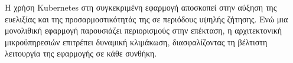 Η χρήση Kubernetes στη συγκεκριμένη εφαρμογή αποσκοπεί στην αύξηση της ευελιξίας και της προσαρμοστικότητάς της σε περιόδους υψηλής ζήτησης. Ενώ μια μονολιθική εφαρμογή παρουσιάζει περιορισμούς στην επέκταση, η αρχιτεκτονική μικροϋπηρεσιών επιτρέπει δυναμική κλιμάκωση, διασφαλίζοντας τη βέλτιστη λειτουργία της εφαρμογής σε κάθε συνθήκη.